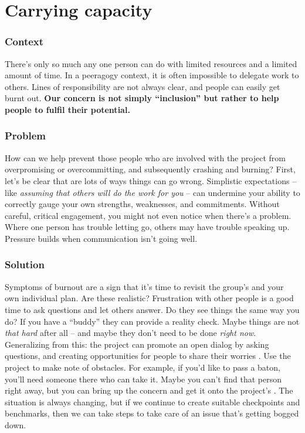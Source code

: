 \section{Carrying capacity}\label{sec:Carrying capacity}

\subsubsection*{Context}

There's only so much any one person can do with limited resources and a limited amount of time. In a peeragogy context, it is often impossible to delegate work to others.  Lines of responsibility are not always clear, and people can easily get burnt out. 
\textbf{Our concern is not simply ``inclusion'' but rather to help people to fulfil their potential.}

\subsubsection*{Problem}

How can we help prevent those people who are involved with the project from overpromising or overcommitting, and subsequently crashing and burning?  First, let's be clear that are lots of ways things can go wrong.  Simplistic expectations -- like \emph{assuming that others will do the work for you} \cite{torvalds-interview} -- can undermine your ability to correctly gauge your own strengths, weaknesses, and commitments.  Without careful, critical engagement, you might not even notice when there's a problem.  Where one person has trouble letting go, others may have trouble speaking up.  Pressure builds when communication isn't going well.  

\subsubsection*{Solution}

Symptoms of burnout are a sign that it's time to revisit the group's  and your own individual plan.  Are these realistic?  Frustration with other people is a good time to ask questions and let others answer.  Do they see things the same way you do?   If you have a ``buddy'' they can provide a reality check.   Maybe things are not \emph{that hard} after all -- and maybe they don't need to be done \emph{right now}.  Generalizing from this: the project can promote an open dialog by asking questions, and creating opportunities for people to share their worries \cite{seikkula2006dialogical}.  Use the project  to make note of obstacles.  For example, if you'd like to pass a baton, you'll need someone there who can take it.  Maybe you can't find that person right away, but you can bring up the concern and get it onto the project's .  The situation is always changing, but if we continue to create suitable checkpoints and benchmarks, then we can take steps to take care of an issue that's getting bogged down.    

